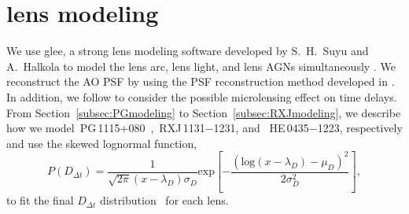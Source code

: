 \documentclass[useAMS,usenatbib]{mnras}
\newcommand\rxj{RXJ\,1131$-$1231}
\newcommand\he{HE\,0435$-$1223}
\newcommand\pg{PG\,1115$+$080}
\newcommand{\sref}[1]{Section~\ref{#1}}
\def\dt{D_{\Delta t}}
\begin{document}
\section{lens modeling}
We use {\sc glee}, a strong lens modeling software developed by S.~H.~Suyu and A.~Halkola to model the lens arc, lens light, and lens AGNs simultaneously \citep{SuyuHalkola10,SuyuEtal12a}. We reconstruct the AO PSF by using the PSF reconstruction method developed in \citet{GChenEtal16}. In addition, we follow \citet{GChenEtal18a} to consider the possible microlensing effect on time delays.
From \sref{subsec:PGmodeling} to \sref{subsec:RXJmodeling}, we describe how we model~\pg~,~\rxj, and ~\he, respectively and use the skewed lognormal function,
\begin{equation}
\label{eq:lognormal}
P(\dt)=\frac{1}{\sqrt{2\pi}(x-\lambda_{D})\sigma_{D}}\text{exp}\left[-\frac{(\text{log}(x-\lambda_{D})-\mu_{D})^{2}}{2\sigma_{D}^{2}}\right],
\end{equation}
to fit the final $\dt$ distribution~\citep{SuyuEtal10,WongEtal17,BonvinEtal17} for each lens.



\end{document}

